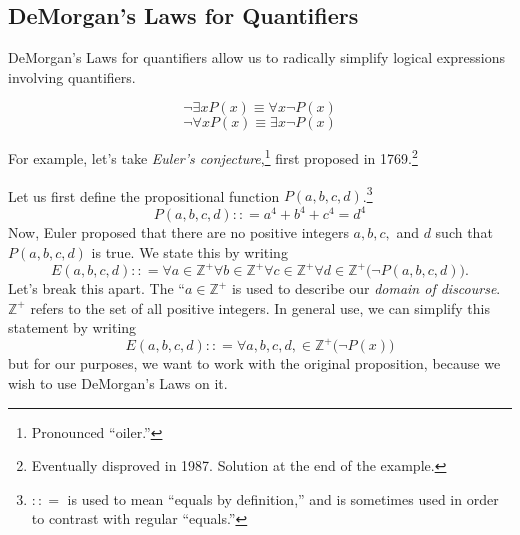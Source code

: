 \subsection{DeMorgan's Laws for Quantifiers}

DeMorgan's Laws for quantifiers allow us to radically simplify logical expressions involving quantifiers.

\begin{equation}
  \neg \exists x P(x) \equiv \forall x \neg P(x)
  \label{eq:dmq1}
\end{equation}
\begin{equation}
  \neg \forall x P(x) \equiv \exists x \neg P(x)
  \label{eq:dmq2}
\end{equation}

\begin{ex}
  For example, let's take \emph{Euler's conjecture},\footnote{Pronounced ``oiler.''} first proposed in 1769.\footnote{Eventually disproved in 1987. Solution at the end of the example.}

  Let us first define the propositional function $P(a,b,c,d)$.\footnote{ $ : : = $ is used to mean ``equals by definition,'' and is sometimes used in order to contrast with regular ``equals.''}
  \[P(a,b,c,d) : : =
    a^4 + b^4 + c^4 = d^4\]
Now, Euler proposed that there are no positive integers $a, b, c,$ and $d$ such that $P(a,b,c,d)$ is true. We state this by writing
  \[ E(a,b,c,d) : : =
    \forall a \in \mathbb{Z^+}
    \forall b \in \mathbb{Z^+}
    \forall c \in \mathbb{Z^+}
    \forall d \in \mathbb{Z^+}
    \big(\neg P(a,b,c,d) \big).\]
Let's break this apart.
The ``$a \in \mathbb{Z^+}$ is used to describe our \emph{domain of discourse}.
$\mathbb{Z^+}$ refers to the set of all positive integers.
In general use, we can simplify this statement by writing
\[ E(a,b,c,d) : : =
  \forall a,b,c,d, \in \mathbb{Z^+} \big( \neg P(x)\big)\]
but for our purposes, we want to work with the original proposition, because we wish to use DeMorgan's Laws on it.


\end{ex}
